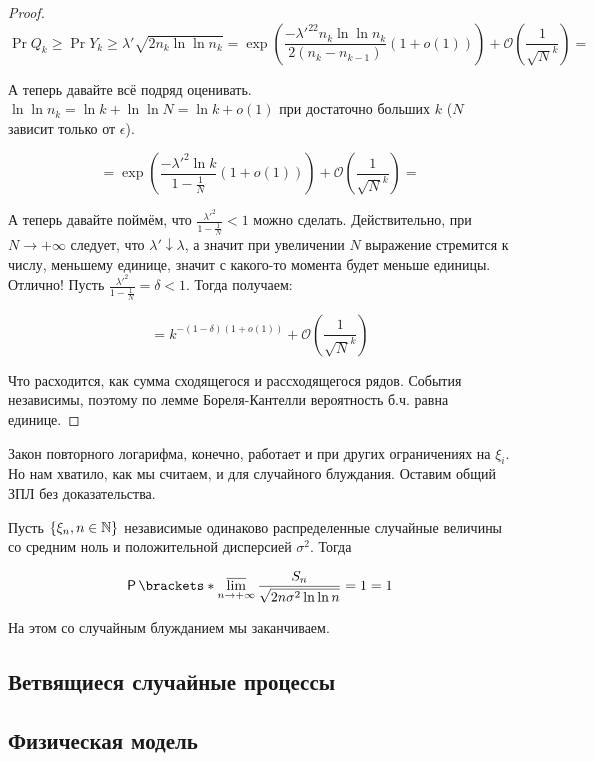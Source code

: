 \begin{proof}
  \[
    \Pr{Q_k} \geq \Pr{Y_k \geq \lambda'\sqrt{2n_k\ln\ln n_k}} = 
    \exp\left(\frac{-\lambda'^22n_k\ln\ln n_k}{2(n_k - n_{k - 1})}(1 + o(1))\right) +
    \mathcal{O}\left(\frac{1}{\sqrt{N}^k}\right) =
  \]

  А теперь давайте всё подряд оценивать. $\ln\ln n_k = \ln k + \ln\ln N = \ln k + o(1)$
  при достаточно больших $k$ ($N$ зависит только от $\epsilon$).

  \[
    = \exp\left(\frac{-\lambda'^2\ln k}{1 - \frac{1}{N}}(1 + o(1))\right) + 
    \mathcal{O}\left(\frac{1}{\sqrt{N}^k}\right) =
  \]

  А теперь давайте поймём, что $\frac{\lambda'^2}{1 - \frac{1}{N}} < 1$ можно
  сделать. Действительно, при $N \to +\infty$ следует, что $\lambda' \downarrow \lambda$,
  а значит при увеличении $N$ выражение стремится к числу, меньшему единице, значит
  с какого-то момента будет меньше единицы. Отлично! Пусть  $\frac{\lambda'^2}{1 - \frac{1}{N}} =
  \delta < 1$. Тогда получаем:

  \[
    = k^{-(1 - \delta)(1 + o(1))} +\mathcal{O}\left(\frac{1}{\sqrt{N}^k}\right)
  \]

  Что расходится, как сумма сходящегося и рассходящегося рядов. События независимы,
  поэтому по лемме Бореля-Кантелли вероятность б.ч. равна единице.
\end{proof}

Закон повторного логарифма, конечно, работает и при других ограничениях на $\xi_i$.
Но нам хватило, как мы считаем, и для случайного блуждания. Оставим общий ЗПЛ
без доказательства.

\begin{theorem}
  Пусть $\{\xi_n, n \in \mathbb{N}\}$ независимые одинаково распределенные случайные
  величины со средним ноль и положительной дисперсией $\sigma^2$. Тогда

  \[
    \Pr{ \varlimsup\limits_{n \to +\infty} \frac{S_n}{\sqrt{2n\sigma^2\ln\ln n}} = 1} = 1 
  \]
\end{theorem}

На этом со случайным блужданием мы заканчиваем.

\subsection{Ветвящиеся случайные процессы}

\subsection{Физическая модель}


